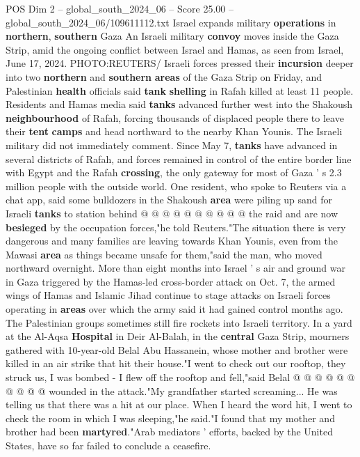 \begin{textsample}{POS Dim 2 – global\_south\_2024\_06 – Score 25.00 – global\_south\_2024\_06/109611112.txt}  \label{ex:f2_pos_059}
Israel expands military \textbf{operations} in \textbf{northern}, \textbf{southern} Gaza An Israeli military \textbf{convoy} moves inside the Gaza Strip, amid the ongoing conflict between Israel and Hamas, as seen from Israel, June 17, 2024.
PHOTO:REUTERS/ Israeli forces pressed their \textbf{incursion} deeper into two \textbf{northern} and \textbf{southern} \textbf{areas} of the Gaza Strip on Friday, and Palestinian \textbf{health} officials said \textbf{tank} \textbf{shelling} in Rafah killed at least 11 people.
Residents and Hamas media said \textbf{tanks} advanced further west into the Shakoush \textbf{neighbourhood} of Rafah, forcing thousands of displaced people there to leave their \textbf{tent} \textbf{camps} and head northward to the nearby Khan Younis.
The Israeli military did not immediately comment.
Since May 7, \textbf{tanks} have advanced in several districts of Rafah, and forces remained in control of the entire border line with Egypt and the Rafah \textbf{crossing}, the only gateway for most of Gaza ' s 2.3 million people with the outside world.
One resident, who spoke to Reuters via a chat app, said some bulldozers in the Shakoush \textbf{area} were piling up sand for Israeli \textbf{tanks} to station behind @ @ @ @ @ @ @ @ @ @ the raid and are now \textbf{besieged} by the occupation forces,"he told Reuters."The situation there is very dangerous and many families are leaving towards Khan Younis, even from the Mawasi \textbf{area} as things became unsafe for them,"said the man, who moved northward overnight.
More than eight months into Israel ' s air and ground war in Gaza triggered by the Hamas-led cross-border attack on Oct. 7, the armed wings of Hamas and Islamic Jihad continue to stage attacks on Israeli forces operating in \textbf{areas} over which the army said it had gained control months ago.
The Palestinian groups sometimes still fire rockets into Israeli territory.
In a yard at the Al-Aqsa \textbf{Hospital} in Deir Al-Balah, in the \textbf{central} Gaza Strip, mourners gathered with 10-year-old Belal Abu Hassanein, whose mother and brother were killed in an air strike that hit their house."I went to check out our rooftop, they struck us, I was bombed - I flew off the rooftop and fell,"said Belal @ @ @ @ @ @ @ @ @ @ wounded in the attack."My grandfather started screaming...
He was telling us that there was a hit at our place.
When I heard the word hit, I went to check the room in which I was sleeping,"he said."I found that my mother and brother had been \textbf{martyred}."Arab mediators ' efforts, backed by the United States, have so far failed to conclude a ceasefire.

\end{textsample}
